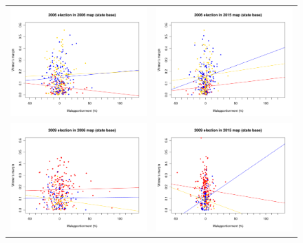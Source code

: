 \documentclass[letter,12pt]{article}
\begin{document}
\begin{figure}
\begin{center}
  \begin{tabular}{cc}
    \includegraphics[width=.4\columnwidth]{../graphs/malmg2006d0sta.pdf} & \includegraphics[width=.4\columnwidth]{../graphs/malmg2006d3sta.pdf} \\
    \includegraphics[width=.4\columnwidth]{../graphs/malmg2009d0sta.pdf} & \includegraphics[width=.4\columnwidth]{../graphs/malmg2009d3sta.pdf} \\

\end{tabular}
\end{center}
\end{figure}
\end{document}
